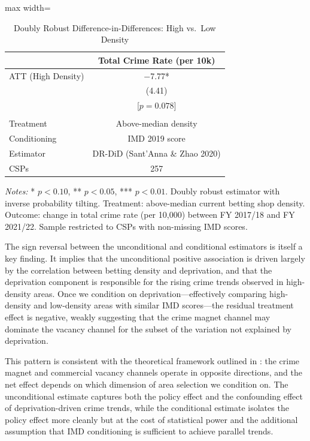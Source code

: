 \documentclass[12pt]{article}
\begin{document}
\begin{table}[H]
\centering
\caption{Doubly Robust Difference-in-Differences: High vs.\ Low Density}
\label{tab:drdid}
\begin{adjustbox}{max width=\textwidth}
\begin{threeparttable}
\begin{tabular}{lc}
\toprule
& Total Crime Rate (per 10k) \\
\midrule
ATT (High Density) & $-$7.77* \\
& (4.41) \\
& [$p = 0.078$] \\
\\
Treatment & Above-median density \\
Conditioning & IMD 2019 score \\
Estimator & DR-DiD (Sant'Anna \& Zhao 2020) \\
CSPs & 257 \\
\bottomrule
\end{tabular}
\begin{tablenotes}[flushleft]
\small
\item \textit{Notes:} * $p<0.10$, ** $p<0.05$, *** $p<0.01$. Doubly robust estimator with inverse probability tilting. Treatment: above-median current betting shop density. Outcome: change in total crime rate (per 10,000) between FY 2017/18 and FY 2021/22. Sample restricted to CSPs with non-missing IMD scores.
\end{tablenotes}
\end{threeparttable}
\end{adjustbox}
\end{table}

The sign reversal between the unconditional and conditional estimators is itself a key finding. It implies that the unconditional positive association is driven largely by the correlation between betting density and deprivation, and that the deprivation component is responsible for the rising crime trends observed in high-density areas. Once we condition on deprivation---effectively comparing high-density and low-density areas with similar IMD scores---the residual treatment effect is negative, weakly suggesting that the crime magnet channel may dominate the vacancy channel for the subset of the variation not explained by deprivation.

This pattern is consistent with the theoretical framework outlined in : the crime magnet and commercial vacancy channels operate in opposite directions, and the net effect depends on which dimension of area selection we condition on. The unconditional estimate captures both the policy effect and the confounding effect of deprivation-driven crime trends, while the conditional estimate isolates the policy effect more cleanly but at the cost of statistical power and the additional assumption that IMD conditioning is sufficient to achieve parallel trends.
\end{document}
